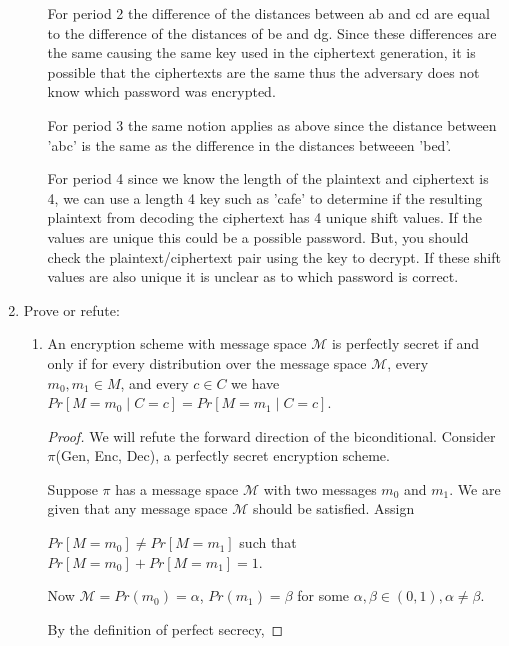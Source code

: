 \documentclass{article}
\begin{document}
\begin{enumerate}
\begin{enumerate}
        For period 2 the difference of the distances between ab and cd are equal to the difference of the distances of be and dg. Since these differences are the same causing the same key used in the ciphertext generation,  it is possible that the ciphertexts are the same thus the adversary does not know which password was encrypted. 

       
        For period 3 the same notion applies as above since the distance between 'abc' is the same as the difference in the distances betweeen 'bed'.


        For period 4 since we know the length of the plaintext and ciphertext is 4, we can use a length 4 key such as 'cafe' to determine if the resulting plaintext from decoding the ciphertext has 4 unique shift values. If the values are unique this could be a possible password. But, you should check the plaintext/ciphertext pair using the key to decrypt. If these shift values are also unique it is unclear as to which password is correct. 
    \end{enumerate}
  \item Prove or refute:
    \begin{enumerate}
      \item An encryption scheme with message space $\mathcal{M}$ is perfectly
        secret if and only if for every distribution over the message space 
        $\mathcal{M}$, every $m_0, m_1 \in M$, and every $c \in C$ we have 
        $Pr\left[M = m_0 \mid C = c\right] = Pr\left[M = m_1 \mid C = c\right]$.

        \begin{proof}
        We will refute the forward direction of the biconditional. Consider $\pi$(Gen, Enc, Dec), a perfectly secret encryption scheme. \newline

        Suppose $\pi$ has a message space $\mathcal{M}$ with two messages $m_0$ and $m_1$. We are given that any message space $\mathcal{M}$ should be satisfied. Assign
        
        $Pr[M = m_0] \neq Pr[M = m_1]$ such that $Pr[M = m_0] + Pr[M = m_1] = 1$.\newline

        Now $\mathcal{M} = 
        Pr(m_0) = \alpha$,
        $Pr(m_1) = \beta$ 
        for some $\alpha, \beta \in (0, 1), \alpha \neq \beta$. \newline

        By the definition of perfect secrecy,


\end{proof}
\end{enumerate}
\end{enumerate}
\end{document}
